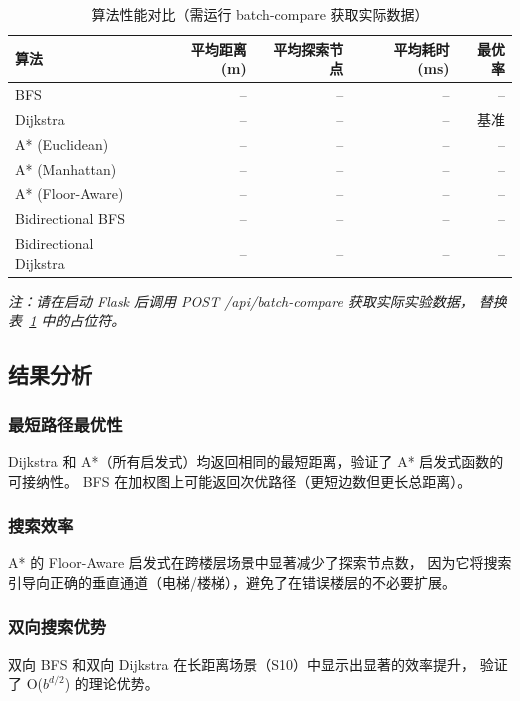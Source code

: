 \documentclass[11pt,a4paper]{ctexart}
\begin{document}
\begin{table}[htbp]
\centering
\small
\begin{tabular}{@{}lrrrr@{}}
\toprule
算法 & 平均距离 (m) & 平均探索节点 & 平均耗时 (ms) & 最优率 \\
\midrule
BFS & -- & -- & -- & -- \\
Dijkstra & -- & -- & -- & 基准 \\
A* (Euclidean) & -- & -- & -- & -- \\
A* (Manhattan) & -- & -- & -- & -- \\
A* (Floor-Aware) & -- & -- & -- & -- \\
Bidirectional BFS & -- & -- & -- & -- \\
Bidirectional Dijkstra & -- & -- & -- & -- \\
\bottomrule
\end{tabular}
\caption{算法性能对比（需运行 batch-compare 获取实际数据）}
\label{tab:results}
\end{table}

\textit{注：请在启动 Flask 后调用 POST /api/batch-compare 获取实际实验数据，
替换表~\ref{tab:results} 中的占位符。}

\subsection{结果分析}

\subsubsection{最短路径最优性}

Dijkstra 和 A*（所有启发式）均返回相同的最短距离，验证了 A* 启发式函数的可接纳性。
BFS 在加权图上可能返回次优路径（更短边数但更长总距离）。

\subsubsection{搜索效率}

A* 的 Floor-Aware 启发式在跨楼层场景中显著减少了探索节点数，
因为它将搜索引导向正确的垂直通道（电梯/楼梯），避免了在错误楼层的不必要扩展。

\subsubsection{双向搜索优势}

双向 BFS 和双向 Dijkstra 在长距离场景（S10）中显示出显著的效率提升，
验证了 O($b^{d/2}$) 的理论优势。
\end{document}
